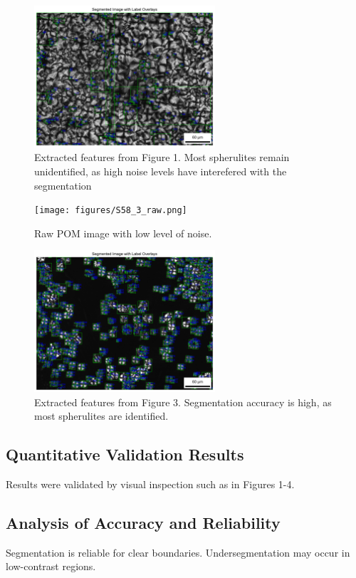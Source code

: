 \documentclass[12pt]{article}
\begin{document}
\begin{figure}[H]
    \centering
    \includegraphics[width=0.6\textwidth]{figures/S72_1_extract.png}
    \caption{\centering Extracted features from Figure 1. Most spherulites remain unidentified, as high noise levels 
    have interefered with the segmentation}
\end{figure}

\begin{figure}[H]
    \centering
    \texttt{[image: figures/S58\_3\_raw.png]}
    \caption{\centering Raw POM image with low level of noise.}
\end{figure}

\begin{figure}[H]
    \centering
    \includegraphics[width=0.6\textwidth]{figures/S58_3_extract.png}
    \caption{\centering Extracted features from Figure 3. Segmentation accuracy is high, as most spherulites are
    identified.}
\end{figure}

\subsection{Quantitative Validation Results}
Results were validated by visual inspection such as in Figures 1-4. 

\subsection{Analysis of Accuracy and Reliability}
Segmentation is reliable for clear boundaries. Undersegmentation may occur in low-contrast regions.
\end{document}
